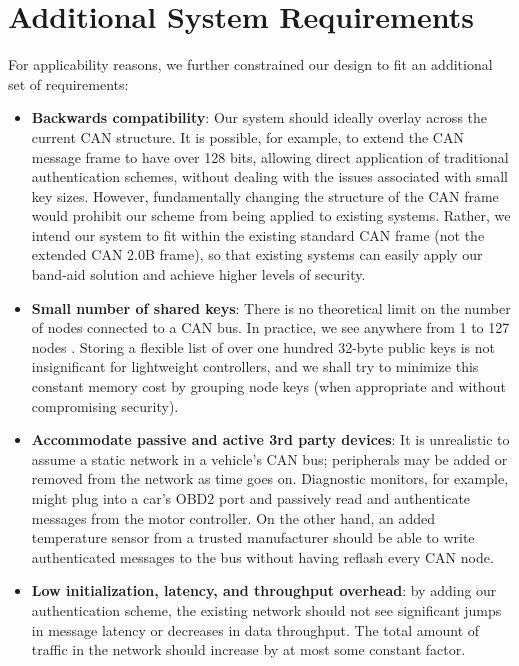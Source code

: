 \documentclass{article}
\begin{document}
\section{Additional System Requirements}

For applicability reasons, we further constrained our design to fit an additional set of requirements:

\begin{itemize}
\item \textbf{Backwards compatibility}: Our system should ideally overlay across the current CAN structure. It is possible, for example, to extend the CAN message frame to have over 128 bits, allowing direct application of traditional authentication schemes, without dealing with the issues associated with small key sizes. However, fundamentally changing the structure of the CAN frame would prohibit our scheme from being applied to existing systems. Rather, we intend our system to fit within the existing standard CAN frame (not the extended CAN 2.0B frame), so that existing systems can easily apply our band-aid solution and achieve higher levels of security.
\item \textbf{Small number of shared keys}: There is no theoretical limit on the number of nodes connected to a CAN bus. In practice, we see anywhere from 1 to 127 nodes \cite{canopen}. Storing a flexible list of over one hundred 32-byte public keys is not insignificant for lightweight controllers, and we shall try to minimize this constant memory cost by grouping node keys (when appropriate and without compromising security).
    \item \textbf{Accommodate passive and active 3rd party devices}: It is unrealistic to assume a static network in a vehicle's CAN bus; peripherals may be added or removed from the network as time goes on. Diagnostic monitors, for example, might plug into a car's OBD2 port and passively read and authenticate messages from the motor controller. On the other hand, an added temperature sensor from a trusted manufacturer should be able to write authenticated messages to the bus without having reflash every CAN node.
\item \textbf{Low initialization, latency, and throughput overhead}: by adding our authentication scheme, the existing network should not see significant jumps in message latency or decreases in data throughput. The total amount of traffic in the network should increase by at most some constant factor.
\end{itemize}
\end{document}
